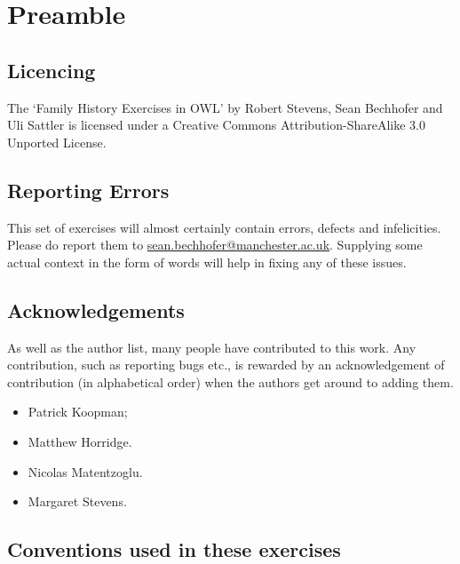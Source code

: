 \chapter*{Preamble}

\section*{Licencing}

The `Family History Exercises in OWL' by Robert Stevens, Sean
Bechhofer and Uli Sattler is licensed under a Creative Commons Attribution-ShareAlike 3.0 Unported License.


\section*{Reporting  Errors}

This set of exercises will almost certainly contain errors, defects
and infelicities. Please do report them to \url{sean.bechhofer@manchester.ac.uk}. Supplying some actual context in the form of words will help in fixing any of these issues.

\section*{Acknowledgements}

As well as the author list, many people have contributed to this
work. Any contribution, such as reporting bugs etc., is rewarded by an
acknowledgement of contribution (in alphabetical order) when the
authors get around to adding them.

\begin{itemize}
\item Patrick Koopman;
\item Matthew Horridge.
\item Nicolas Matentzoglu.
\item Margaret Stevens. 
\end{itemize}

\section*{Conventions used in these exercises}

